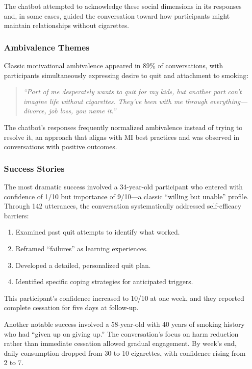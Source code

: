 The chatbot attempted to acknowledge these social dimensions in its responses and, in some cases, guided the conversation toward how participants might maintain relationships without cigarettes.

\subsubsection*{Ambivalence Themes}

Classic motivational ambivalence appeared in 89\% of conversations, with participants simultaneously expressing desire to quit and attachment to smoking:

\begin{quote}
	\textit{``Part of me desperately wants to quit for my kids, but another part can't imagine life without cigarettes. They've been with me through everything---divorce, job loss, you name it.''}
\end{quote}

The chatbot's responses frequently normalized ambivalence instead of trying to resolve it, an approach that aligns with MI best practices and was observed in conversations with positive outcomes.

\subsubsection*{Success Stories}

The most dramatic success involved a 34-year-old participant who entered with confidence of 1/10 but importance of 9/10---a classic ``willing but unable'' profile. Through 142 utterances, the conversation systematically addressed self-efficacy barriers:

\begin{enumerate}
	\item Examined past quit attempts to identify what worked.
	\item Reframed ``failures'' as learning experiences.
	\item Developed a detailed, personalized quit plan.
	\item Identified specific coping strategies for anticipated triggers.
\end{enumerate}

This participant's confidence increased to 10/10 at one week, and they reported complete cessation for five days at follow-up.

Another notable success involved a 58-year-old with 40 years of smoking history who had ``given up on giving up.'' The conversation's focus on harm reduction rather than immediate cessation allowed gradual engagement. By week's end, daily consumption dropped from 30 to 10 cigarettes, with confidence rising from 2 to 7.

